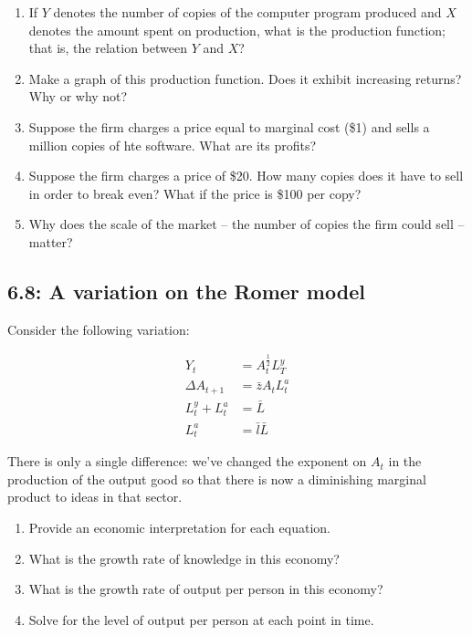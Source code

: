 \documentclass{article}
\begin{document}
\begin{enumerate}
\item If $Y$ denotes the number of copies of the computer program produced and $X$ denotes the amount spent on production, what is the production function; that is, the relation between $Y$ and $X$?
\item Make a graph of this production function. Does it exhibit increasing returns? Why or why not?
\item Suppose the firm charges a price equal to marginal cost (\$1) and sells a million copies of hte software. What are its profits?
\item Suppose the firm charges a price of \$20. How many copies does it have to sell in order to break even? What if the price is \$100 per copy?
\item Why does the scale of the market -- the number of copies the firm could sell -- matter?
\end{enumerate}

\subsection*{6.8: A variation on the Romer model}

Consider the following variation:

\begin{align*}
Y_t &= A_t^{\frac12} L^y_T \\
\Delta A_{t+1} &= \bar{z} A_t L^a_t \\
L^y_t + L^a_t &= \bar{L} \\
L^a_t &= \bar{l} \bar{L}
\end{align*}

There is only a single difference: we've changed the exponent on $A_t$ in the production of the output good so that there is now a diminishing marginal product to ideas in that sector.

\begin{enumerate}
\item Provide an economic interpretation for each equation.
\item What is the growth rate of knowledge in this economy?
\item What is the growth rate of output per person in this economy?
\item Solve for the level of output per person at each point in time.
\end{enumerate}
\end{document}
